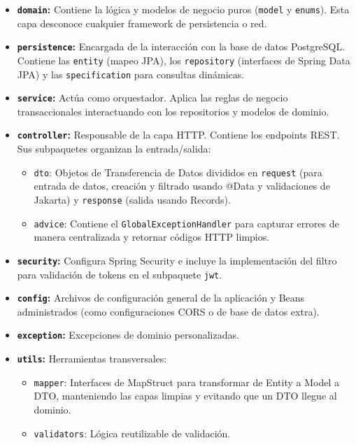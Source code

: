 \documentclass[12pt, a4paper]{article}
\begin{document}
\begin{itemize}
    \item \textbf{\texttt{domain}:} Contiene la lógica y modelos de negocio puros (\texttt{model} y \texttt{enums}). Esta capa desconoce cualquier framework de persistencia o red. 
    \item \textbf{\texttt{persistence}:} Encargada de la interacción con la base de datos PostgreSQL. Contiene las \texttt{entity} (mapeo JPA), los \texttt{repository} (interfaces de Spring Data JPA) y las \texttt{specification} para consultas dinámicas.
    \item \textbf{\texttt{service}:} Actúa como orquestador. Aplica las reglas de negocio transaccionales interactuando con los repositorios y modelos de dominio.
    \item \textbf{\texttt{controller}:} Responsable de la capa HTTP. Contiene los endpoints REST. Sus subpaquetes organizan la entrada/salida:
    \begin{itemize}
        \item \texttt{dto}: Objetos de Transferencia de Datos divididos en \texttt{request} (para entrada de datos, creación y filtrado usando @Data y validaciones de Jakarta) y \texttt{response} (salida usando Records).
        \item \texttt{advice}: Contiene el \texttt{GlobalExceptionHandler} para capturar errores de manera centralizada y retornar códigos HTTP limpios.
    \end{itemize}
    \item \textbf{\texttt{security}:} Configura Spring Security e incluye la implementación del filtro para validación de tokens en el subpaquete \texttt{jwt}.
    \item \textbf{\texttt{config}:} Archivos de configuración general de la aplicación y Beans administrados (como configuraciones CORS o de base de datos extra).
    \item \textbf{\texttt{exception}:} Excepciones de dominio personalizadas.
    \item \textbf{\texttt{utils}:} Herramientas transversales:
    \begin{itemize}
        \item \texttt{mapper}: Interfaces de MapStruct para transformar de Entity a Model a DTO, manteniendo las capas limpias y evitando que un DTO llegue al dominio.
        \item \texttt{validators}: Lógica reutilizable de validación.
    \end{itemize}
\end{itemize}
\end{document}
